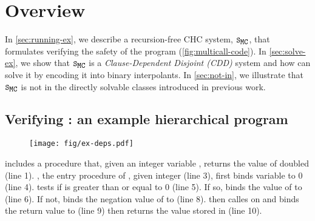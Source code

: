 \section{Overview}
\label{sec:overview}

In \autoref{sec:running-ex}, we describe a recursion-free CHC system,
$\mcchc$, that formulates verifying the safety of the program
 (\autoref{fig:multicall-code}).
%
In \autoref{sec:solve-ex}, we show that $\mcchc$ is a
\emph{Clause-Dependent Disjoint (CDD)} system and how \sys can solve it by 
encoding it into binary interpolants.
%
In \autoref{sec:not-in}, we illustrate that
$\mcchc$ is not in the directly solvable classes introduced in
previous work.
%


\subsection{Verifying : an example hierarchical program}
\label{sec:running-ex}

\begin{figure}[t]
  \centering
  \begin{floatrow}[2]
    {  }
    { \texttt{[image: fig/ex-deps.pdf]} }
  \end{floatrow}
\end{figure}
%
 includes a procedure  that, given an integer
variable , returns the value of  doubled (line 1).
%
, the entry procedure of , given integer 
(line 3), first binds variable  to $0$ (line 4).
%
 tests if  is greater than or equal to $0$ (line
5).
%
If so,  binds the value of  to  (line 6).
%
If not,  binds the negation value of  to  (line 8).
%
 then calles  on  and binds the return value to  (line 9)
%
 then returns the value stored in  (line 10).

